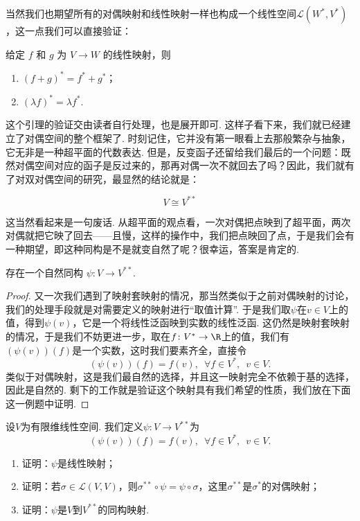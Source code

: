 当然我们也期望所有的对偶映射和线性映射一样也构成一个线性空间$\mathcal{L}(W^*,V^*)$，这一点我们可以直接验证：
\begin{lemma}{}{}
    给定 $f$ 和 $g$ 为 $V \to W$ 的线性映射，则
    \begin{enumerate}
        \item $(f + g)^* = f^* + g^*$；
        \item $(\lambda f)^* = \lambda f^*$.
    \end{enumerate}
\end{lemma}

这个引理的验证交由读者自行处理，也是展开即可. 这样子看下来，我们就已经建立了对偶空间的整个框架了. 时刻记住，它并没有第一眼看上去那般繁杂与抽象，它无非是一种超平面的代数表达. 但是，反变函子还留给我们最后的一个问题：既然对偶空间对应的函子是反过来的，那再对偶一次不就回去了吗？因此，我们就有了对双对偶空间的研究，最显然的结论就是：

\[
    V \cong V^{**}
\]

这当然看起来是一句废话. 从超平面的观点看，一次对偶把点映到了超平面，两次对偶就把它映了回去——且慢，这样的操作中，我们把点映回了点，于是我们会有一种期望，即这种同构是不是就变自然了呢？很幸运，答案是肯定的.

\begin{theorem}{}{}
    存在一个自然同构 $\psi: V \to V^{**}$.
\end{theorem}

\begin{proof}
    又一次我们遇到了映射套映射的情况，那当然类似于之前对偶映射的讨论，我们的处理手段就是对需要定义的映射进行``取值计算''. 于是我们取$\psi$在$v\in V$上的值，得到$\psi(v)$，它是一个将线性泛函映到实数的线性泛函. 这仍然是映射套映射的情况，于是我们不妨更进一步，取在$f\colon V^*\to\R$上的值，我们有$(\psi(v))(f)$是一个实数，这时我们要素齐全，直接令
    \[(\psi(v))(f) = f(v),\enspace\forall f\in V^*,\enspace v\in V.\]
    类似于对偶映射，这是我们最自然的选择，并且这一映射完全不依赖于基的选择，因此是自然的. 剩下的工作就是验证这个映射具有我们希望的性质，我们放在下面这一例题中证明.
\end{proof}

\begin{example}{}{}
    设$V$为有限维线性空间. 我们定义$\psi:V\to V^{**}$为
    \[(\psi(v))(f) = f(v),\enspace\forall f\in V^*,\enspace v\in V.\]
    \begin{enumerate}
        \item 证明：$\psi$是线性映射；

        \item 证明：若$\sigma\in\mathcal{L}(V,V)$，则$\sigma^{**}\circ\psi=\psi\circ\sigma$，这里$\sigma^{**}$是$\sigma^*$的对偶映射；

        \item 证明：$\psi$是$V$到$V^{**}$的同构映射.
    \end{enumerate}
\end{example}

